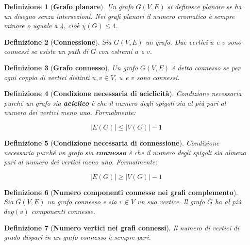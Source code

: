 \documentclass[10pt,a4paper,titlepage]{article}
\theoremstyle{break}
\newtheorem{myDef}{Definizione}
\theoremstyle{break}
\theoremstyle{break}
\begin{document}
\begin{myDef}[\textbf{Grafo planare}]
Un grafo $G(V,E)$ si definisce \textit{planare} se ha un disegno senza intersezioni. Nei grafi planari il numero cromatico è sempre minore o uguale a 4, cioè $\chi(G) \leq 4$.
\end{myDef}

\begin{myDef}[\textbf{Connessione}]
Sia $G(V, E)$ un grafo. Due vertici $u$ e $v$ sono \textit{connessi} se esiste un path di $G$ con estremi $u$ e $v$.
\end{myDef}

\begin{myDef}[\textbf{Grafo connesso}]
Un grafo $G(V, E)$ è detto \textit{connesso} se per ogni coppia di vertici distinti $u, v \in V$, $u$ e $v$ sono connessi.
\end{myDef}

\begin{myDef}[\textbf{Condizione necessaria di aciclicità}]

Condizione necessaria purché un grafo sia \textbf{aciclico} è che il numero degli spigoli sia al più pari al numero dei vertici meno uno. Formalmente:

\begin{equation}
|E(G)| \leqslant |V(G)| - 1
\end{equation}
\end{myDef}

\begin{myDef}[\textbf{Condizione necessaria di connessione}]
Condizione necessaria purché un grafo sia \textbf{connesso} è che il numero degli spigoli sia almeno pari al numero dei vertici meno uno. Formalmente: 

\begin{equation}
|E(G)| \geqslant |V (G)| - 1
\end{equation}
\end{myDef}

\begin{myDef}[\textbf{Numero componenti connesse nei grafi complemento}]
Sia $G(V, E)$ un grafo connesso e sia $v \in V$ un suo vertice. Il grafo $\overline{G}$ ha al più $deg(v)$ componenti connesse.
\end{myDef}

\begin{myDef}[\textbf{Numero vertici nei grafi connessi}]
Il numero di vertici di grado dispari in un grafo connesso è \textit{sempre pari}.
\end{myDef}
\end{document}
